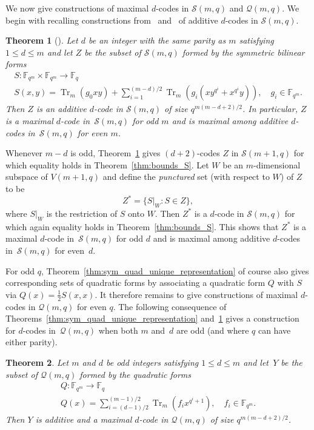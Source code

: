 \documentclass[10pt]{article}
\newtheorem{theorem}{Theorem}[section]
\theoremstyle{definition}
\newcommand{\FF}{\mathbb{F}}
\newcommand{\Q}{\mathscr{Q}}
\renewcommand{\S}{\mathscr{S}}
\DeclareMathOperator{\Tr}{Tr}
\begin{document}
We now give constructions of maximal $d$-codes in $\S(m,q)$ and $\Q(m,q)$. We begin with recalling constructions from~\cite{Sch2010} and~\cite{Sch2015} of additive $d$-codes in $\S(m,q)$.
\begin{theorem}[{\cite[Theorem.~4.4]{Sch2015}}]
\label{thm:constr_sym}
Let $d$ be an integer with the same parity as $m$ satisfying $1\le d\le m$ and let $Z$ be the subset of $\S(m,q)$ formed by the symmetric bilinear forms
\begin{gather*}
S:\FF_{q^m}\times \FF_{q^m}\to\FF_q\\
S(x,y)=\Tr_m(g_0xy)+\sum_{i=1}^{(m-d)/2}\Tr_m(g_i(xy^{q^i}+x^{q^i}y)),\quad g_i\in\FF_{q^m}.
\end{gather*}
Then $Z$ is an additive $d$-code in $\S(m,q)$ of size $q^{m(m-d+2)/2}$. In particular, $Z$ is a maximal $d$-code in~$\S(m,q)$ for odd $m$ and is maximal among additive $d$-codes in~$\S(m,q)$ for even $m$.
\end{theorem}
\par
Whenever $m-d$ is odd, Theorem~\ref{thm:constr_sym} gives $(d+2)$-codes $Z$ in $\S(m+1,q)$ for which equality holds in Theorem~\ref{thm:bounds_S}. Let $W$ be an $m$-dimensional subspace of $V(m+1,q)$ and define the \emph{punctured} set (with respect to $W$) of $Z$ to be
\[
Z^*=\big\{S|_W:S\in Z\big\},
\] 
where $S|_W$ is the restriction of $S$ onto $W$. Then $Z^*$ is a $d$-code in $\S(m,q)$ for which again equality holds in Theorem~\ref{thm:bounds_S}. This shows that $Z^*$ is a maximal $d$-code in~$\S(m,q)$ for odd $d$ and is maximal among additive $d$-codes in~$\S(m,q)$ for even~$d$.
\par
For odd $q$, Theorem~\ref{thm:sym_quad_unique_representation} of course also gives corresponding sets of quadratic forms by associating a quadratic form $Q$ with $S$ via $Q(x)=\tfrac{1}{2}S(x,x)$. It therefore remains to give constructions of maximal $d$-codes in $\Q(m,q)$ for even $q$. The following consequence of Theorems~\ref{thm:sym_quad_unique_representation} and~\ref{thm:constr_sym} gives a construction for $d$-codes in~$\Q(m,q)$ when both $m$ and~$d$ are odd (and where $q$ can have either parity).
\begin{theorem}
\label{thm:constr_m_odd_d_odd}
Let $m$ and $d$ be odd integers satisfying $1\le d\le m$ and let~$Y$ be the subset of $\Q(m,q)$ formed by the quadratic forms
\begin{gather*}
Q:\FF_{q^m}\to\FF_q\\
Q(x)=\sum_{i=(d-1)/2}^{(m-1)/2}\Tr_m(f_ix^{q^i+1}),\quad f_i\in\FF_{q^m}.
\end{gather*}
Then $Y$ is additive and a maximal $d$-code in $\Q(m,q)$ of size $q^{m(m-d+2)/2}$.
\end{theorem}
\end{document}
